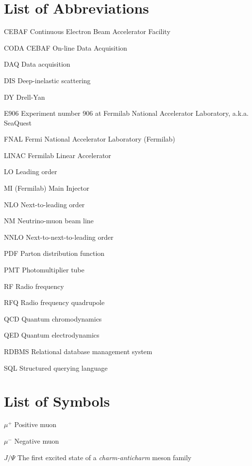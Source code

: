 \documentclass[edeposit,fullpage]{uiucthesis2009}
\begin{document}
\tableofcontents
\listoftables
\listoffigures

\chapter{List of Abbreviations}

\begin{symbollist*}
	\item[CEBAF] Continuous Electron Beam Accelerator Facility
	\item[CODA] CEBAF On-line Data Acquisition
	\item[DAQ] Data acquisition
	\item[DIS] Deep-inelastic scattering
	\item[DY] Drell-Yan
	\item[E906] Experiment number 906 at Fermilab National Accelerator Laboratory, a.k.a. SeaQuest
	\item[FNAL] Fermi National Accelerator Laboratory (Fermilab)
	\item[LINAC] Fermilab Linear Accelerator
	\item[LO] Leading order
	\item[MI] (Fermilab) Main Injector
	\item[NLO] Next-to-leading order
	\item[NM] Neutrino-muon beam line
	\item[NNLO] Next-to-next-to-leading order
	\item[PDF] Parton distribution function
	\item[PMT] Photomultiplier tube
	\item[RF] Radio frequency
	\item[RFQ] Radio frequency quadrupole
	\item[QCD] Quantum chromodynamics
	\item[QED] Quantum electrodynamics
	\item[RDBMS] Relational database management system
	\item[SQL] Structured querying language
\end{symbollist*}

\chapter{List of Symbols}

\begin{symbollist}[0.7in]
\item[$\mu^+$] Positive muon
\item[$\mu^-$] Negative muon
\item[$J/\Psi$] The first excited state of a \emph{charm-anticharm} meson family
\end{symbollist}

\mainmatter









\appendix



\backmatter



\end{document}
